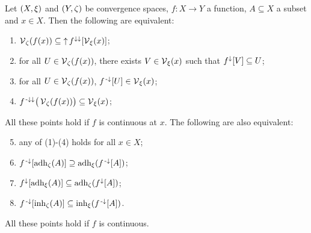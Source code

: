 \begin{proposition} \label{continuityVicinityFilter} \label{adherenceInherenceContinuity}
Let $\sSet{X,\xi}$ and $\sSet{Y,\zeta}$ be convergence spaces, $f: X\to Y$ a function, $A\subseteq X$ a subset and $x\in X$. Then the following are equivalent:
\begin{enumerate}
\item $\operatorname{\mathcal{V}}_\zeta(f(x)) \subseteq \operatorname{\uparrow} f^{\downarrow\downarrow}[\operatorname{\mathcal{V}}_\xi(x)]$;
\item for all $U\in \operatorname{\mathcal{V}}_\zeta(f(x))$, there exists $V\in \operatorname{\mathcal{V}}_\xi(x)$ such that $f^\downarrow[V] \subseteq U$;
\item for all $U\in \operatorname{\mathcal{V}}_\zeta(f(x))$, $f^{{\text{\hspace{0.15em}-}\downarrow}}[U]\in \operatorname{\mathcal{V}}_\xi(x)$;
\item $f^{{\text{\hspace{0.15em}-}\downarrow}\downarrow}\big(\operatorname{\mathcal{V}}_\zeta(f(x))\big) \subseteq \operatorname{\mathcal{V}}_\xi(x)$;
\end{enumerate}
All these points hold if $f$ is continuous at $x$. The following are also equivalent:
\begin{enumerate} \setcounter{enumi}{4}
\item any of (1)-(4) holds for all $x\in X$;
\item $f^{\text{\hspace{0.15em}-}\downarrow}[\operatorname{adh}_\zeta(A)] \supseteq \operatorname{adh}_\xi(f^{\text{\hspace{0.15em}-}\downarrow}[A])$;
\item $f^\downarrow[\operatorname{adh}_\xi(A)] \subseteq \operatorname{adh}_\zeta(f^\downarrow[A])$;
\item $f^{\text{\hspace{0.15em}-}\downarrow}[\operatorname{inh}_\zeta(A)] \subseteq \operatorname{inh}_\xi(f^{\text{\hspace{0.15em}-}\downarrow}[A])$.
\end{enumerate}
All these points hold if $f$ is continuous.
\end{proposition}
